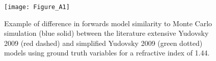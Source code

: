 \begin{figure}[htb!]
    \centering
    \texttt{[image: Figure\_A1]}
    \caption{Example of difference in forwards model similarity to Monte Carlo simulation (blue solid) between the literature extensive Yudovsky 2009 (red dashed) and simplified Yudovsky 2009 (green dotted) models using ground truth variables for a refractive index of 1.44.}
 \label{fig:badYudovsky}
\end{figure}
\FloatBarrier


